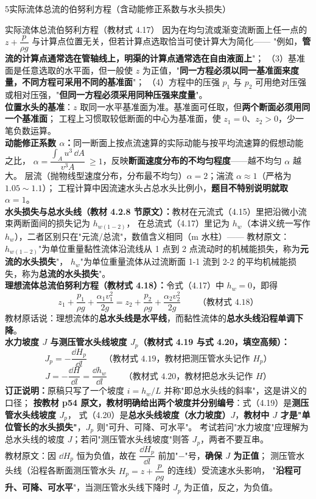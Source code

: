 \begin{kaodian}{5}{实际流体总流的伯努利方程（含动能修正系数与水头损失）}
\begin{gongshi}{实际流体总流伯努利方程（教材式 4.17）}
因为在均匀流或渐变流断面上任一点的 $z+\dfrac{p}{\rho g}$ 与计算点位置无关，但若计算点选取恰当可使计算大为简化——
"例如，\textbf{管流的计算点通常选在管轴线上，明渠的计算点通常选在自由液面上}"；
（3）基准面是任意选取的水平面，但一般使 $z$ 为正值，"\textbf{同一方程必须以同一基准面来度量，不同方程可采用不同的基准面}"；
（4）方程中的压强 $p_1$ 与 $p_2$ 可用绝对压强或相对压强，"\textbf{但同一方程必须采用同种压强来度量}"。\\
\textbf{位置水头的基准}：$z$ 取同一水平基准面为准。基准面可任取，但\textbf{两个断面必须用同一个基准面}；
工程上习惯取较低断面的中心为基准面，使 $z_1=0$、$z_2>0$，少一笔负数运算。\\
\textbf{动能修正系数 $\alpha$：}同一断面上按点流速算的实际动能与按平均流速算的假想动能之比，
$\alpha=\dfrac{\displaystyle\int_A u^3\,\dd A}{v^3 A}\ \ge 1$，反映\textbf{断面速度分布的不均匀程度}——越不均匀 $\alpha$ 越大。
层流（抛物线型速度分布，分布最不均匀）$\alpha=2$；湍流 $\alpha\approx 1$（严格为 $1.05\sim1.1$）；
工程计算中因流速水头占总水头比例小，\textbf{题目不特别说明就取 $\alpha=1$}。\\
\textbf{水头损失与总水头线（教材 4.2.8 节原文）：}教材在元流式（4.15）里把沿微小流束两断面间的损失记为 $h_{w(1-2)}$，
在总流式（4.17）里记为 $h_w$（本讲义统一写作 $h_w$），二者区别只在"元流/总流"，数值含义相同（$\mathrm{m}$ 水柱）——
教材原文：$h_{w(1-2)}$"为单位重量黏性流体沿流线从 1 点到 2 点流动时的机械能损失，称为\textbf{元流的水头损失}"，
$h_w$"为单位重量流体从过流断面 1-1 流到 2-2 的平均机械能损失，称为\textbf{总流的水头损失}"。\\
\textbf{理想流体总流伯努利方程（教材式 4.18）：}令式（4.17）中 $h_w=0$，即得
\[ z_1+\frac{p_1}{\rho g}+\frac{\alpha_1 v_1^2}{2g}=z_2+\frac{p_2}{\rho g}+\frac{\alpha_2 v_2^2}{2g}\qquad\text{（教材式 4.18）} \]
教材原话说：理想流体的\textbf{总水头线是水平线}，而黏性流体的\textbf{总水头线沿程单调下降}。\\
\textbf{水力坡度 $J$ 与测压管水头线坡度 $J_p$（教材式 4.19 与式 4.20，填空高频）：}
\[ J_p=-\frac{\dd H_p}{\dd l}\qquad\text{（教材式 4.19，教材把测压管水头记作 }H_p\text{）} \]
\[ J=-\frac{\dd H}{\dd l}=\frac{\dd h_w}{\dd l}\qquad\text{（教材式 4.20，教材把总水头记作 }H\text{）} \]
\textbf{订正说明：}原稿只写了一个坡度 $i=h_w/L$ 并称"即总水头线的斜率"，这是讲义的口径；
\textbf{按教材 p54 原文，教材明确给出两个坡度并分别编号}：式（4.19）是\textbf{测压管水头线坡度 $J_p$}，
式（4.20）是\textbf{总水头线坡度（水力坡度）$J$}，\textbf{教材中 $J$ 才是"单位管长的水头损失"}，$J_p$ 则"可升、可降、可水平"。
考试若问"水力坡度"应理解为总水头线的坡度 $J$；若问"测压管水头线坡度"则答 $J_p$，两者不要互串。\\
教材原文：因 $\dd H_p$ 恒为负值，故在 $\dfrac{\dd H_p}{\dd l}$ 前加"$-$"号，\textbf{确保 $J$ 为正值}；
测压管水头线（沿程各断面测压管水头 $H_p=z+\dfrac{p}{\rho g}$ 的连线）受流速水头影响，
"\textbf{沿程可升、可降、可水平}"，当测压管水头线下降时 $J_p$ 为正值，反之，为负值。
\end{gongshi}


\end{kaodian}
